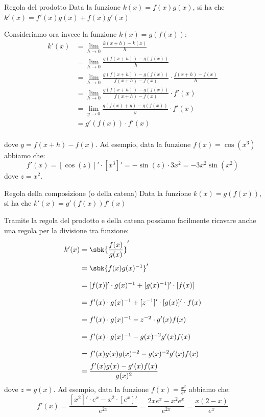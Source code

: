 \documentclass[a4paper, 12pt]{report}
\begin{document}
    \begin{framedprop}{Regola del prodotto}
        Data la funzione $k(x) = f(x)g(x)$, si ha che $k'(x) = f'(x)g(x)+f(x)g'(x)$
    \end{framedprop}
    
    Consideriamo ora invece la funzione $k(x) = g(f(x))$:
    \[\begin{split}
        k'(x) &= \lim_{h \to 0} \frac{k(x+h)-k(x)}{h}\\
        &= \lim_{h \to 0} \frac{g(f(x+h))-g(f(x))}{h}\\
        &= \lim_{h \to 0} \frac{g(f(x+h))-g(f(x))}{f(x+h)-f(x)} \cdot \frac{f(x+h)-f(x)}{h}\\
        &= \lim_{h \to 0} \frac{g(f(x+h))-g(f(x))}{f(x+h) - f(x)} \cdot f'(x)\\
        &= \lim_{y \to 0} \frac{g(f(x)+y)-g(f(x))}{y} \cdot f'(x)\\
        &= g'(f(x)) \cdot f'(x)\\
    \end{split}\]

    dove $y = f(x+h) - f(x)$. Ad esempio, data la funzione $f(x) = \cos (x^3)$ abbiamo che:
    \[f'(x) = [\cos (z)]' \cdot [x^3]' = -\sin(z) \cdot 3x^2 = -3x^2\sin(x^2)\]
    dove $z = x^2$. 
    
    \begin{framedprop}{Regola della composizione (o della catena)}
        Data la funzione $k(x) = g(f(x))$, si ha che $k'(x) = g'(f(x))f'(x)$
    \end{framedprop}

    Tramite la regola del prodotto e della catena possiamo facilmente ricavare anche una regola per la divisione tra funzione:
    \[\arraycolsep=1.4pt\def\arraystretch{2}
    \begin{array}{rl}
        k'(x) &= \sbk{\dfrac{f(x)}{g(x)}}' \\
        &= \sbk{f(x)g(x)^{-1}}' \\
        &= [f(x)]' \cdot g(x)^{-1} + [g(x)^{-1}]' \cdot [f(x)]\\
        &= f'(x) \cdot g(x)^{-1} + [z^{-1}]' \cdot [g(x)]' \cdot f(x) \\
        &= f'(x) \cdot g(x)^{-1} -z^{-2} \cdot g'(x) f(x) \\
        &= f'(x) \cdot g(x)^{-1} -g(x)^{-2}g'(x) f(x) \\
        &= f'(x) g(x) g(x)^{-2} -g(x)^{-2}g'(x) f(x) \\
        &= \dfrac{f'(x) g(x) -g'(x) f(x)}{g(x)^2} \\
    \end{array}\]
    dove $z = g(x)$. Ad esempio, data la funzione $f(x) = \frac{x^2}{e^x}$ abbiamo che:
    \[f'(x) = \frac{[x^2]' \cdot e^x - x^2 \cdot [e^x]'}{e^{2x}} = \frac{2x e^x-x^2e^x}{e^{2x}} = \frac{x(2-x)}{e^x}\]
\end{document}
